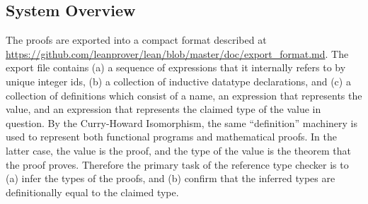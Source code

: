 \documentclass{article}
\begin{document}
\begin{spacing}{1.1}
\section{System Overview}

The proofs are exported into a compact format described at \url{https://github.com/leanprover/lean/blob/master/doc/export_format.md}. The export file contains (a) a sequence of expressions that it internally refers to by unique integer ids, (b) a collection of inductive datatype declarations, and (c) a collection of definitions which consist of a name, an expression that represents the value, and an expression that represents the claimed type of the value in question. By the Curry-Howard Isomorphism, the same ``definition'' machinery is used to represent both functional programs and mathematical proofs. In the latter case, the value is the proof, and the type of the value is the theorem that the proof proves. Therefore the primary task of the reference type checker is to (a) infer the types of the proofs, and (b) confirm that the inferred types are definitionally equal to the claimed type.


\end{spacing}
\end{document}
